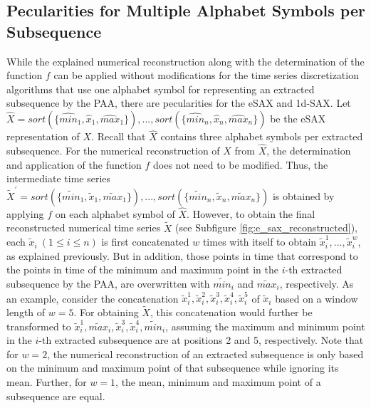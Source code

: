 \subsection*{Pecularities for Multiple Alphabet Symbols per Subsequence}
While the explained numerical reconstruction along with the determination of the function $f$ can be applied without modifications for the time series discretization algorithms that use one alphabet symbol for representing an extracted subsequence by the \ac{PAA}, there are pecularities for the \ac{eSAX} and \ac{1d-SAX}. \newline
Let $\hat{X} = sort(\{\hat{min}_1, \hat{x}_1, \hat{max}_1\}), ..., sort(\{\hat{min}_n, \hat{x}_n, \hat{max}_n\})$ be the \ac{eSAX} representation of $X$. Recall that $\hat{X}$ contains three alphabet symbols per extracted subsequence. For the numerical reconstruction of $X$ from $\hat{X}$, the determination and application of the function $f$ does not need to be modified. Thus, the intermediate time series $\tilde{X}^{'} = sort(\{\tilde{min}_1, \tilde{x}_1, \tilde{max}_1\}), ..., sort(\{\tilde{min}_n, \tilde{x}_n, \tilde{max}_n\})$ is obtained by applying $f$ on each alphabet symbol of $\hat{X}$. However, to obtain the final reconstructed numerical time series $\tilde{X}$ (see Subfigure \ref{fig:e_sax_reconstructed}), each $\tilde{x}_i \ (1 \leq i \leq n)$ is first concatenated $w$ times with itself to obtain $\tilde{x}_{i}^{1}, ..., \tilde{x}_{i}^{w}$, as explained previously. But in addition, those points in time that correspond to the points in time of the minimum and maximum point in the $i$-th extracted subsequence by the \ac{PAA}, are overwritten with $\tilde{min}_i$ and $\tilde{max}_i$, respectively. As an example, consider the concatenation $\tilde{x}_{i}^1, \tilde{x}_{i}^2, \tilde{x}_{i}^3, \tilde{x}_{i}^4, \tilde{x}_{i}^5$ of $\tilde{x}_i$ based on a window length of $w = 5$. For obtaining $\tilde{X}$, this concatenation would further be transformed to $\tilde{x}_{i}^1, \tilde{max}_{i}, \tilde{x}_{i}^3, \tilde{x}_{i}^4, \tilde{min}_{i}$, assuming the maximum and minimum point in the $i$-th extracted subsequence are at positions 2 and 5, respectively. Note that for $w = 2$, the numerical reconstruction of an extracted subsequence is only based on the minimum and maximum point of that subsequence while ignoring its mean. Further, for $w = 1$, the mean, minimum and maximum point of a subsequence are equal. \newline
